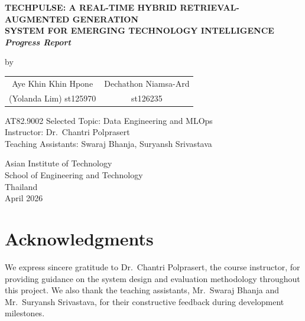 \begin{titlepage}
\begin{center}
\vspace*{0.5cm}
{\fontsize{14}{18}\bfseries\MakeUppercase{%
TechPulse: A Real-Time Hybrid Retrieval-Augmented Generation\\
System for Emerging Technology Intelligence}\\[4pt]
\normalsize\mdseries\textit{Progress Report}}

\vspace{1.8cm}
{\normalsize by}

    \vspace{1em}

    \begin{tabular}{cc}
        Aye Khin Khin Hpone  & Dechathon Niamsa-Ard \\
        {\small (Yolanda Lim) st125970} & {\small st126235}
    \end{tabular}

\vfill

{\normalsize AT82.9002 Selected Topic: Data Engineering and MLOps}\\[6pt]
{\normalsize Instructor: Dr.\ Chantri Polprasert}\\[4pt]
{\normalsize Teaching Assistants: Swaraj Bhanja, Suryansh Srivastava}

\vfill
{\normalsize
Asian Institute of Technology\\[4pt]
School of Engineering and Technology\\[4pt]
Thailand\\[8pt]
April 2026
}
\end{center}
\end{titlepage}

\chapter*{Acknowledgments}

We express sincere gratitude to Dr.\ Chantri Polprasert, the course instructor, for providing guidance on the system design and evaluation methodology throughout this project. We also thank the teaching assistants, Mr.\ Swaraj Bhanja and Mr.\ Suryansh Srivastava, for their constructive feedback during development milestones.



